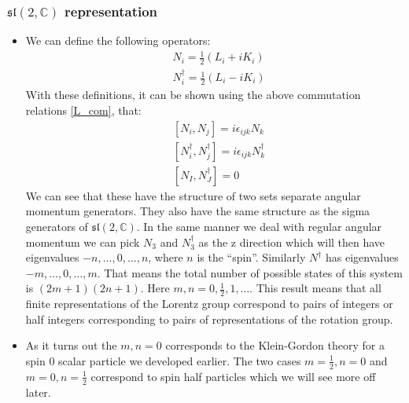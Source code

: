 \documentclass[11pt]{article}
\numberwithin{equation}{section}
\begin{document}
     \subsubsection{$\mathfrak{sl}(2,\mathbb{C})$ representation}
     \begin{itemize}
       \item We can define the following operators:
       \begin{align*}
         & N_{i} = \frac{1}{2}(L_{i}+iK_{i}) \\
         & N^{\dagger}_{i} = \frac{1}{2}(L_{i}-iK_{i})
       \end{align*}
       With these definitions, it can be shown using the above commutation relations \ref{L_com}, that:
       \begin{align*}
         & [N_{i},N_{j}] = i\epsilon_{ijk}N_{k} \\
        &  [N^{\dagger}_{i},N^{\dagger}_{j}] = i\epsilon_{ijk}N^{\dagger}_{k} \\
        & [N_{I},N^{\dagger}_{J}]= 0          
       \end{align*}
       We can see that these have the structure of two sets separate angular momentum generators. They also have the same structure as the sigma generators of $\mathfrak{sl}(2,\mathbb{C})$. In the same manner we deal with regular angular momentum we can pick $N_{3}$ and $N^{\dagger}_{3}$ as the z direction which will then have eigenvalues $-n,\ldots,0,\ldots,n$, where $n$ is the ``spin''. Similarly $N^{\dagger}$ has eigenvalues $-m,\ldots,0,\ldots,m$. That means the total number of possible states of this system is $(2m+1)(2n+1)$. Here $m,n=0,\frac{1}{2},1,\ldots$. This result means that all finite representations of the Lorentz group correspond to pairs of integers or half integers corresponding to pairs of representations of the rotation group.  

      \item As it turns out the $m,n=0$ corresponds to the Klein-Gordon theory for a spin $0$ scalar particle we developed earlier. The two cases $m=\frac{1}{2},n=0$ and $m=0,n=\frac{1}{2}$ correspond to spin half particles which we will see more off later. 
     \end{itemize}
\end{document}
